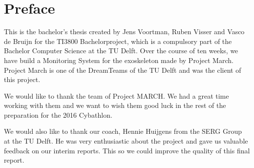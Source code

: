 \chapter*{Preface}
This is the bachelor’s thesis created by Jens Voortman, Ruben Visser and Vasco de Bruijn for the TI3800 Bachelorproject, which is a compulsory part of the Bachelor Computer Science at the TU Delft. Over the course of ten weeks, we have build a Monitoring System for the exoskeleton made by Project March. Project March is one of the DreamTeams of the TU Delft and was the client of this project.

We would like to thank the team of Project MARCH. We had a great time working with them and we want to wish them good luck in the rest of the preparation for the 2016 Cybathlon.

We would also like to thank our coach, Hennie Huijgens from the SERG Group at the TU Delft. He was very enthusiastic about the project and gave us valuable feedback on our interim reports. This so we could improve the quality of this final report. 